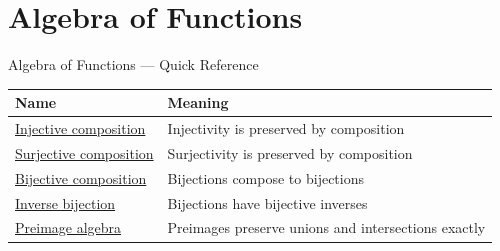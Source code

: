 \section{Algebra of Functions}

\begin{toolkitbox}{Algebra of Functions --- Quick Reference}
\small
\begin{tabular}{l l}
\toprule
\textbf{Name} & \textbf{Meaning} \\
\midrule
\hyperref[prop:composition-injective]{Injective composition} & Injectivity is preserved by composition \\
\hyperref[prop:composition-surjective]{Surjective composition} & Surjectivity is preserved by composition \\
\hyperref[cor:composition-bijective]{Bijective composition} & Bijections compose to bijections \\
\hyperref[prop:inverse-bijection]{Inverse bijection} & Bijections have bijective inverses \\
\hyperref[prop:preimage-union-intersection]{Preimage algebra} & Preimages preserve unions and intersections exactly \\
\bottomrule
\end{tabular}
\end{toolkitbox}


